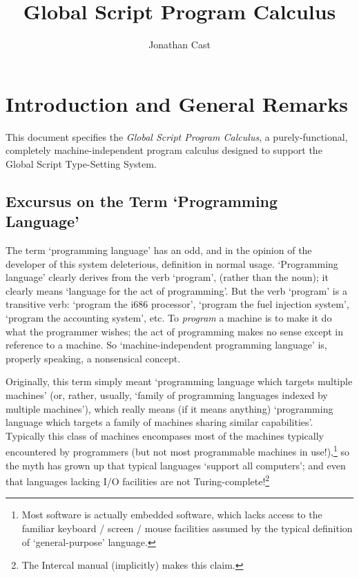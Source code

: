 \documentclass{report}
\title{Global Script Program Calculus}
\author{Jonathan Cast}
\newcommand\defn[1]{\emph{#1}}
\begin{document}
\maketitle

\tableofcontents

\chapter{Introduction and General Remarks}

This document specifies the \defn{Global Script Program Calculus}, a purely-functional, completely machine-independent program calculus designed to support the Global Script Type-Setting System.

\section{Excursus on the Term `Programming Language'}

The term `programming language' has an odd, and in the opinion of the developer of this system deleterious, definition in normal usage.
`Programming language' clearly derives from the verb `program', (rather than the noun);
it clearly means `language for the act of programming'.
But the verb `program' is a transitive verb: `program the i686 processor', `program the fuel injection system', `program the accounting system', etc.
To \defn{program} a machine is to make it do what the programmer wishes;
the act of programming makes no sense except in reference to a machine.
So `machine-independent programming language' is, properly speaking, a nonsensical concept.

Originally, this term simply meant `programming language which targets multiple machines'
(or, rather, usually, `family of programming languages indexed by multiple machines'),
which really means (if it means anything) `programming language which targets a family of machines sharing similar capabilities'.
Typically this class of machines encompases most of the machines typically encountered by programmers
(but not most programmable machines in use!),\footnote{Most software is actually embedded software, which lacks access to the familiar keyboard / screen / mouse facilities assumed by the typical definition of `general-purpose' language.}
so the myth has grown up that typical languages `support all computers';
and even that languages lacking I/O facilities are not Turing-complete!\footnote{The Intercal manual (implicitly) makes this claim.}
\end{document}
